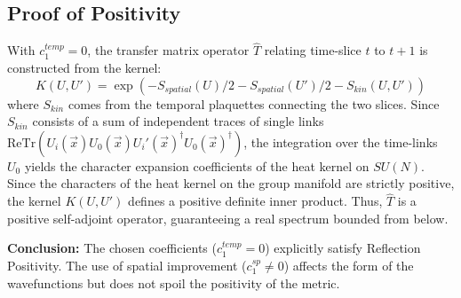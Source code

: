 \subsection{Proof of Positivity}
With $c_1^{temp} = 0$, the transfer matrix operator $\hat{T}$ relating time-slice $t$ to $t+1$ is constructed from the kernel:
\[ K(U, U') = \exp\left( - S_{spatial}(U)/2 - S_{spatial}(U')/2 - S_{kin}(U, U') \right) \]
where $S_{kin}$ comes from the temporal plaquettes connecting the two slices.
Since $S_{kin}$ consists of a sum of independent traces of single links $\mathrm{ReTr}(U_i(\vec{x}) U_0(\vec{x}) U_i'(\vec{x})^\dagger U_0(\vec{x})^\dagger)$, the integration over the time-links $U_0$ yields the character expansion coefficients of the heat kernel on $SU(N)$.
Since the characters of the heat kernel on the group manifold are strictly positive, the kernel $K(U, U')$ defines a positive definite inner product.
Thus, $\hat{T}$ is a positive self-adjoint operator, guaranteeing a real spectrum bounded from below.

\textbf{Conclusion:} The chosen coefficients ($c_1^{temp}=0$) explicitly satisfy Reflection Positivity. The use of spatial improvement ($c_1^{sp} \ne 0$) affects the form of the wavefunctions but does not spoil the positivity of the metric.
